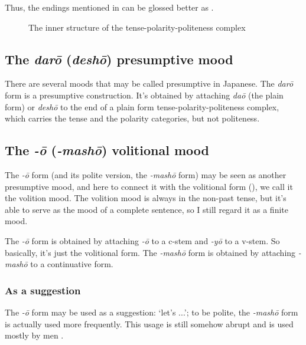 \documentclass[UTF8, a4paper, oneside, scheme=plain]{ctexrep}
\newcommand*{\citepage}[1]{pp.~{#1}}
\newcommand{\corpus}[1]{\emph{#1}}
\newcommand{\translate}[1]{`#1'}
\begin{document}
Thus, the endings mentioned in  can be glossed better as 
.

\begin{figure}[H]
    \centering
    
    \caption{The inner structure of the tense-polarity-politeness complex}
    \label{fig:analyzing-tpp-complex}
\end{figure}

\subsection{The \corpus{dar\={o}} (\corpus{desh\={o}}) presumptive mood}\label{sec:daro-form}

There are several moods that may be called presumptive in Japanese.
The \corpus{dar\={o}} form is a presumptive construction.
It's obtained by attaching \corpus{da\={o}} (the plain form)
or \corpus{desh\={o}} to the end of a plain form tense-polarity-politeness complex,
which carries the tense and the polarity categories, 
but not politeness.

\subsection{The \corpus{-\={o}} (\corpus{-mash\={o}}) volitional mood}\label{sec:volition-mood}

The \corpus{-\={o}} form (and its polite version, the \corpus{-mash\={o}} form) 
may be seen as another presumptive mood,
and here to connect it with the volitional form (),
we call it the volition mood.
The volition mood is always in the non-past tense,
but it's able to serve as the mood of a complete sentence,
so I still regard it as a finite mood. 

The \corpus{-\={o}} form is obtained by attaching \corpus{-\={o}} to a c-stem 
and \corpus{-y\={o}} to a v-stem.
So basically, it's just the volitional form.
The \corpus{-mash\={o}} form is obtained by attaching \corpus{-mash\={o}} to a continuative form.

\subsubsection{As a suggestion}

The \corpus{-\={o}} form may be used as a suggestion: \translate{let's ...};
to be polite, the \corpus{-mash\={o}} form is actually used more frequently.
This usage is still somehow abrupt and is used mostly by men \citep[\citepage{112}]{akiyama2012japanese}.
\end{document}
